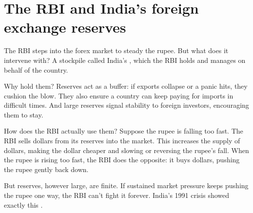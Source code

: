 \section{The RBI and India's foreign exchange reserves}\label{sec:reserves}

The RBI steps into the forex market to steady the rupee. But what does it intervene with? A stockpile called India's , which the RBI holds and manages on behalf of the country.

Why hold them? Reserves act as a buffer: if exports collapse or a panic hits, they cushion the blow. They also ensure a country can keep paying for imports in difficult times. And large reserves signal stability to foreign investors, encouraging them to stay.


How does the RBI actually use them? Suppose the rupee is falling too fast. The RBI sells dollars from its reserves into the market. This  increases the supply of dollars, making the dollar cheaper and slowing or reversing the rupee's fall. When the rupee is rising too fast, the RBI does the opposite: it buys dollars, pushing the rupee gently back down.


But reserves, however large, are finite. If sustained market pressure keeps pushing the rupee one way, the RBI can't fight it forever. India's 1991 crisis showed exactly this .
